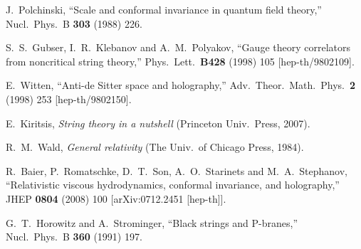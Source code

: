 \begin{thebibliography}{99}
  J.~Polchinski,
  ``Scale and conformal invariance in quantum field theory,''
  Nucl.\ Phys.\  B {\bf 303} (1988) 226.

  S.~S.~Gubser, I.~R.~Klebanov and A.~M.~Polyakov,
  ``Gauge theory correlators from noncritical string theory,''
  Phys.\ Lett.\  {\bf B428 } (1998)  105
  [hep-th/9802109].
  
  E.~Witten,
  ``Anti-de Sitter space and holography,''
  Adv.\ Theor.\ Math.\ Phys.\  {\bf 2 } (1998)  253
  [hep-th/9802150].

  E.~Kiritsis,
  \textit{String theory in a nutshell}
  (Princeton Univ.\ Press, 2007).

R.~M.~Wald,
\textit{General relativity}
(The Univ.\ of Chicago Press, 1984).

  R.~Baier, P.~Romatschke, D.~T.~Son, A.~O.~Starinets and M.~A.~Stephanov,
  ``Relativistic viscous hydrodynamics, conformal invariance, and holography,''
  JHEP {\bf 0804} (2008) 100
  [arXiv:0712.2451 [hep-th]].

  G.~T.~Horowitz and A.~Strominger,
  ``Black strings and P-branes,''
  Nucl.\ Phys.\ B {\bf 360} (1991) 197.

\end{thebibliography}